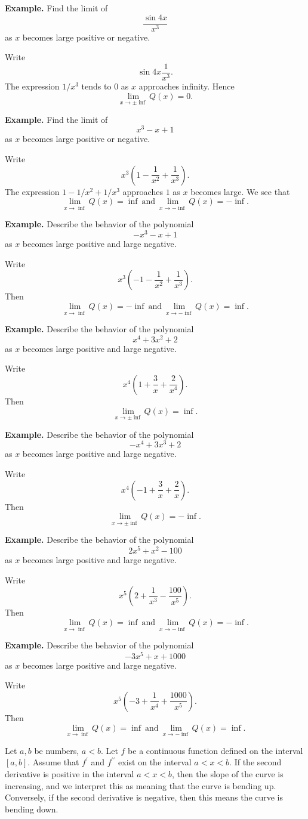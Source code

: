\textbf{Example.} Find the limit of
\[\frac{\sin 4x}{x^3}\]
as $x$ becomes large positive or negative.

Write
\[\sin 4x \frac{1}{x^3}.\]
The expression $1/x^3$ tends to $0$ as $x$ approaches infinity. Hence
\[\lim_{x\to\pm\inf} Q(x) = 0.\]

\textbf{Example.} Find the limit of
\[x^3 - x + 1\]
as $x$ becomes large positive or negative.

Write
\[x^3(1 - \frac{1}{x^2} + \frac{1}{x^3}).\]
The expression $1 - 1/x^2 + 1/x^3$ approaches $1$ as $x$ becomes large. We see that
\[\lim_{x\to\inf} Q(x) = \inf\: \text{and}\: \lim_{x\to-\inf} Q(x) = -\inf.\]

\textbf{Example.} Describe the behavior of the polynomial
\[-x^3 - x + 1\]
as $x$ becomes large positive and large negative.

Write
\[x^3(-1 - \frac{1}{x^2} + \frac{1}{x^3}).\]
Then
\[\lim_{x\to\inf} Q(x) = -\inf\: \text{and}\: \lim_{x\to-\inf} Q(x) = \inf.\]

\textbf{Example.} Describe the behavior of the polynomial
\[x^4 + 3x^2 + 2\]
as $x$ becomes large positive and large negative.

Write
\[x^4(1 + \frac{3}{x} + \frac{2}{x^4}).\]
Then
\[\lim_{x\to\pm\inf} Q(x) = \inf.\]

\textbf{Example.} Describe the behavior of the polynomial
\[-x^4 + 3x^3 + 2\]
as $x$ becomes large positive and large negative.

Write
\[x^4(-1 + \frac{3}{x} + \frac{2}{x}).\]
Then
\[\lim_{x\to\pm\inf} Q(x) = -\inf.\]

\textbf{Example.} Describe the behavior of the polynomial
\[2x^5 + x^2 - 100\]
as $x$ becomes large positive and large negative.

Write
\[x^5(2 + \frac{1}{x^3} - \frac{100}{x^5}).\]
Then
\[\lim_{x\to\inf} Q(x) = \inf\: \text{and}\: \lim_{x\to-\inf} Q(x) = -\inf.\]

\textbf{Example.} Describe the behavior of the polynomial
\[-3x^5 + x + 1000\]
as $x$ becomes large positive and large negative.

Write
\[x^5(-3 + \frac{1}{x^4} + \frac{1000}{x^5}).\]
Then
\[\lim_{x\to\inf} Q(x) = \inf\: \text{and}\: \lim_{x\to-\inf} Q(x) = \inf.\]

Let $a, b$ be numbers, $a < b$. Let $f$ be a continuous function defined on the interval $[a, b]$. Assume that $f^\prime$ and $f^{\prime\prime}$ exist on the interval $a < x < b$. If the second derivative is positive in the interval $a < x < b$, then the slope of the curve is increasing, and we interpret this as meaning that the curve is bending up. Conversely, if the second derivative is 
negative, then this means the curve is bending down.

